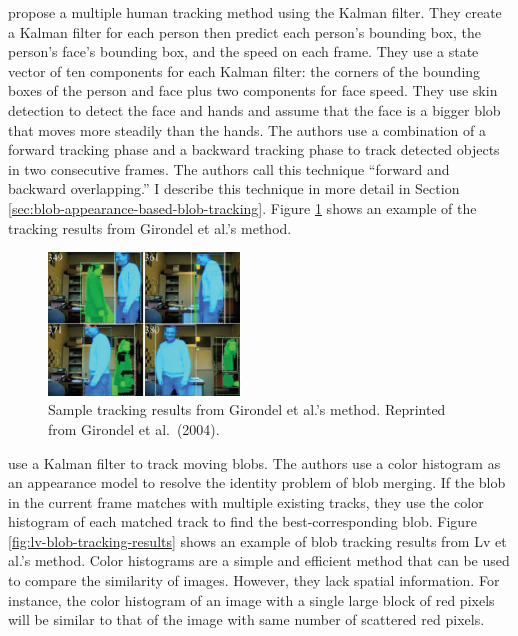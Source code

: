  propose a multiple human tracking method using
the Kalman filter. They create a Kalman filter for each person then predict
each person's bounding box, the person's face's bounding box, and the speed on
each frame. They use a state vector of ten components for each Kalman filter:
the corners of the bounding boxes of the person and face plus two components
for face speed. They use skin detection to detect the face and hands and assume
that the face is a bigger blob that moves more steadily than the hands.  The
authors use a combination of a forward tracking phase and a backward tracking
phase to track detected objects in two consecutive frames. The authors  call
this technique ``forward and backward overlapping.'' I describe this technique
in more detail in Section \ref{sec:blob-appearance-based-blob-tracking}.
Figure \ref{fig:girondel-tracking-result} shows an example of the tracking
results from Girondel et al.'s method.

\begin{figure}[t]
  \centering
  \includegraphics[width=2in]{figures/girondel-tracking-result.png}
  \caption[Sample tracking results from Girondel et al.'s
    method.]{\small Sample tracking results from Girondel et al.'s
    method. Reprinted from Girondel et al.\ (2004).}
  \label{fig:girondel-tracking-result}
\end{figure}

 use a Kalman filter to track moving blobs. The
authors use a color histogram as an appearance model to resolve the identity
problem of blob merging. If the blob in the current frame matches with multiple
existing tracks, they use the color histogram of each matched track to find the
best-corresponding blob. Figure \ref{fig:lv-blob-tracking-results} shows an
example of blob tracking results from Lv et al.'s method.  Color histograms are
a simple and efficient method that can be used to compare the similarity of
images. However, they lack spatial information. For instance, the color
histogram of an image with a single large block of red pixels will be similar
to that of the image with same number of scattered red pixels.

